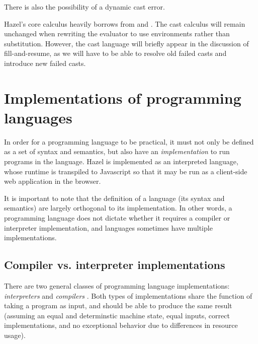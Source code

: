 There is also the possibility of a dynamic cast error.

\begin{singlespace}
  \begin{mathpar}
  \end{mathpar}
\end{singlespace}

Hazel's core calculus heavily borrows from \gtlc and \gtclc. The cast calculus will remain unchanged when rewriting the evaluator to use environments rather than substitution. However, the cast language will briefly appear in the discussion of fill-and-resume, as we will have to be able to resolve old failed casts and introduce new failed casts.

\section{Implementations of programming languages}
\label{sec:interpreters}

In order for a programming language to be practical, it must not only be defined as a set of syntax and semantics, but also have an \textit{implementation} to run programs in the language. Hazel is implemented as an interpreted language, whose runtime is transpiled to Javascript so that it may be run as a client-side web application in the browser.

It is important to note that the definition of a language (its syntax and semantics) are largely orthogonal to its implementation. In other words, a programming language does not dictate whether it requires a compiler or interpreter implementation, and languages sometimes have multiple implementations.

\subsection{Compiler vs. interpreter implementations}
\label{sec:comp-vs-interp}

There are two general classes of programming language implementations: \textit{interpreters} and \textit{compilers} \cite{aho86}. Both types of implementations share the function of taking a program as input, and should be able to produce the same result (assuming an equal and determinstic machine state, equal inputs, correct implementations, and no exceptional behavior due to differences in resource usage).

